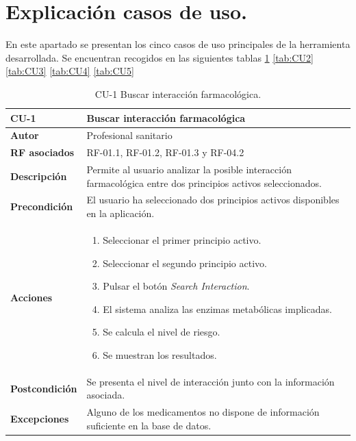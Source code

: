 \section{Explicación casos de uso.}
En este apartado se presentan los cinco casos de uso principales de la herramienta desarrollada.
Se encuentran recogidos en las siguientes tablas \ref{tab:CU1} \ref{tab:CU2} \ref{tab:CU3} \ref{tab:CU4} \ref{tab:CU5} 
\begin{table}[ht]
	\centering
	\begin{tabularx}{\linewidth}{ p{} p{} }
		\toprule
		\textbf{CU-1} & \textbf{Buscar interacción farmacológica}\\
		\toprule
		\textbf{Autor} & Profesional sanitario\\
		\textbf{RF asociados} & RF-01.1, RF-01.2, RF-01.3 y RF-04.2\\
		\textbf{Descripción} & Permite al usuario analizar la posible interacción farmacológica entre dos principios activos seleccionados.\\
		\textbf{Precondición} & El usuario ha seleccionado dos principios activos disponibles en la aplicación.\\
		\textbf{Acciones} &
		\begin{enumerate}
			\item Seleccionar el primer principio activo.
			\item Seleccionar el segundo principio activo.
			\item Pulsar el botón \textit{Search Interaction}.
			\item El sistema analiza las enzimas metabólicas implicadas.
			\item Se calcula el nivel de riesgo.
			\item Se muestran los resultados.
		\end{enumerate}\\
		\textbf{Postcondición} & Se presenta el nivel de interacción junto con la información asociada.\\
		\textbf{Excepciones} & Alguno de los medicamentos no dispone de información suficiente en la base de datos.\\
		\bottomrule
	\end{tabularx}
	\caption{CU-1 Buscar interacción farmacológica.}
	\label{tab:CU1}
\end{table}
